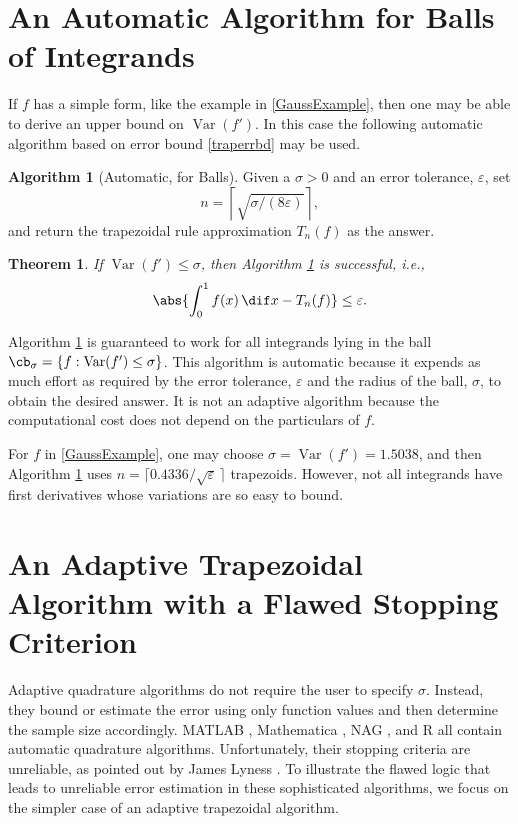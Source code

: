 \documentclass[]{article}
\DeclareMathOperator{\Var}{Var}
\newtheorem{theorem}{Theorem}
\theoremstyle{definition}
\newtheorem{algo}{Algorithm}
\theoremstyle{remark}
\begin{document}
\section{An Automatic Algorithm for Balls of Integrands} \label{autoballsec}

If $f$ has a simple form, like the example in \eqref{GaussExample}, then one may be able to derive an upper bound on $\Var(f')$.  In this case the following automatic algorithm based on error bound \eqref{traperrbd} may be used.  

\begin{algo}[Automatic, for Balls] \label{ballalgo} Given a $\sigma>0$ and an error tolerance, $\varepsilon$, set 
\begin{equation}\label{algo1n}
n = \left \lceil \sqrt{\sigma/(8\varepsilon)} \right \rceil,
\end{equation}
and return the trapezoidal rule approximation $T_n(f)$ as the answer.
\end{algo}
\begin{theorem} \label{ballalgothm} If $\Var(f') \le \sigma$, then Algorithm \ref{ballalgo} is successful, i.e., 
\[
\abs{\int_0^1 f(x) \, \dif x - T_n(f)}\le \varepsilon.
\]
\end{theorem}

Algorithm \ref{ballalgo} is guaranteed to work for all integrands lying in the ball $\cb_{\sigma}=\{f : \Var(f') \le \sigma\}$.  This algorithm is automatic because it expends as much effort as required by the error tolerance, $\varepsilon$ and the radius of the ball, $\sigma$, to obtain the desired answer.  It is not an adaptive algorithm because the computational cost does not depend on the particulars of $f$.

For $f$ in \eqref{GaussExample}, one may choose $\sigma=\Var(f')=1.5038$, and then Algorithm \ref{ballalgo} uses $n = \lceil 0.4336/\sqrt{\varepsilon}\, \rceil$ trapezoids.  However, not all integrands have first derivatives whose variations are so easy to bound.  

\section{An Adaptive Trapezoidal Algorithm with a Flawed Stopping Criterion} \label{flawstopsec}

Adaptive quadrature algorithms do not require the user to specify $\sigma$.  Instead, they bound or estimate the error using only function values and then determine the sample size accordingly.  MATLAB , Mathematica , NAG , and R  all contain automatic quadrature algorithms.  Unfortunately, their stopping criteria are unreliable, as pointed out by James Lyness .  To illustrate the flawed logic that leads to unreliable error estimation in these sophisticated algorithms, we focus on the simpler case of an adaptive trapezoidal algorithm.
\end{document}
